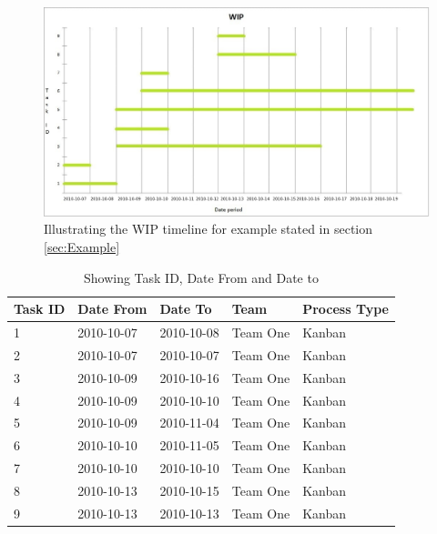 \documentclass[UKenglish]{ifimaster}  %
\begin{document}
\begin{figure}[ht!]
 \begin{adjustwidth}{-1.5cm}{}
\centering
\hspace*{-1in}
\includegraphics[width=21cm,trim=4 8 8 4,clip]{Picture/wip_example.jpg}
\caption{Illustrating the WIP timeline for example stated in section \ref{sec:Example}}
\label{wip_timeline}
\end{adjustwidth}
\end{figure}

\newpage
\begin{table}[!ht]
\begin{center}
    \begin{tabular}{| l | l | p{2cm} | l | l |}
    \hline
   Task ID &   Date From  & Date To & Team & Process Type\\ \hline
     1 & 2010-10-07 & 2010-10-08 & Team One & Kanban  \\ \hline
     2 & 2010-10-07 & 2010-10-07 & Team One & Kanban   \\ \hline
     3 & 2010-10-09 & 2010-10-16 & Team One & Kanban   \\ \hline
     4 & 2010-10-09 & 2010-10-10 & Team One & Kanban   \\ \hline
     5 & 2010-10-09 & 2010-11-04 & Team One & Kanban   \\ \hline
     6 & 2010-10-10 & 2010-11-05 & Team One & Kanban  \\ \hline
     7 & 2010-10-10 & 2010-10-10 & Team One & Kanban   \\ \hline
     8 & 2010-10-13 & 2010-10-15 & Team One & Kanban  \\ \hline
     9 & 2010-10-13 & 2010-10-13  & Team One  & Kanban   \\ \hline
    \end{tabular}
\caption{Showing Task ID, Date From and Date to}
\label{wt:2} %
\end{center}
\end{table}
\end{document}
